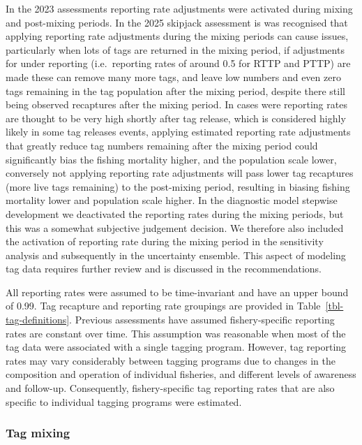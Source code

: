 \documentclass[
  english,
  a4paper,
  a4paper,
  11pt]{SCreport}
\begin{document}
In the 2023 assessments reporting rate adjustments were activated during
mixing and post-mixing periods. In the 2025 skipjack assessment is was
recognised that applying reporting rate adjustments during the mixing
periods can cause issues, particularly when lots of tags are returned in
the mixing period, if adjustments for under reporting (i.e.~reporting
rates of around 0.5 for RTTP and PTTP) are made these can remove many
more tags, and leave low numbers and even zero tags remaining in the tag
population after the mixing period, despite there still being observed
recaptures after the mixing period. In cases were reporting rates are
thought to be very high shortly after tag release, which is considered
highly likely in some tag releases events, applying estimated reporting
rate adjustments that greatly reduce tag numbers remaining after the
mixing period could significantly bias the fishing mortality higher, and
the population scale lower, conversely not applying reporting rate
adjustments will pass lower tag recaptures (more live tags remaining) to
the post-mixing period, resulting in biasing fishing mortality lower and
population scale higher. In the diagnostic model stepwise development we
deactivated the reporting rates during the mixing periods, but this was
a somewhat subjective judgement decision. We therefore also included the
activation of reporting rate during the mixing period in the sensitivity
analysis and subsequently in the uncertainty ensemble. This aspect of
modeling tag data requires further review and is discussed in the
recommendations.

All reporting rates were assumed to be time-invariant and have an upper
bound of 0.99. Tag recapture and reporting rate groupings are provided
in Table~\ref{tbl-tag-definitions}. Previous assessments have assumed
fishery-specific reporting rates are constant over time. This assumption
was reasonable when most of the tag data were associated with a single
tagging program. However, tag reporting rates may vary considerably
between tagging programs due to changes in the composition and operation
of individual fisheries, and different levels of awareness and
follow-up. Consequently, fishery-specific tag reporting rates that are
also specific to individual tagging programs were estimated.

\subsubsection{Tag mixing}\label{sec-tag-mixing}
\end{document}

